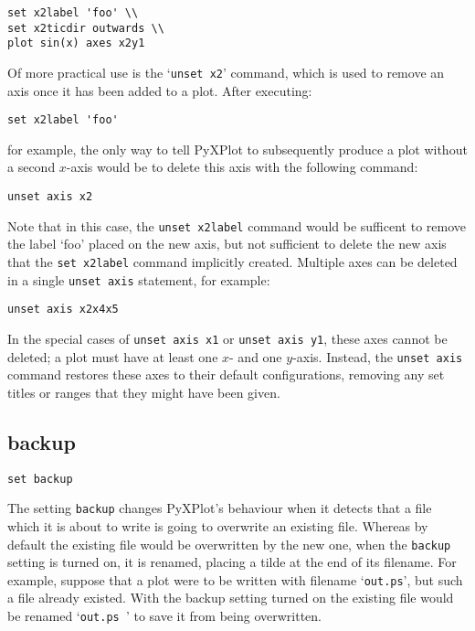 \documentclass[a4paper,onecolumn,11pt]{book}
\begin{document}
\begin{verbatim}
set x2label 'foo' \\
set x2ticdir outwards \\
plot sin(x) axes x2y1
\end{verbatim}

Of more practical use is the `{\tt unset x2}' command, which is used to remove an
axis once it has been added to a plot. After executing:

\begin{verbatim}
set x2label 'foo'
\end{verbatim}

\noindent for example, the only way to tell PyXPlot to subsequently produce a plot
without a second $x$-axis would be to delete this axis with the following
command:

\begin{verbatim}
unset axis x2
\end{verbatim}

Note that in this case, the {\tt unset x2label} command would be sufficent to
remove the label `foo' placed on the new axis, but not sufficient to delete the
new axis that the {\tt set x2label} command implicitly created. Multiple axes
can be deleted in a single {\tt unset axis} statement, for example:

\begin{verbatim}
unset axis x2x4x5
\end{verbatim}

In the special cases of {\tt unset axis x1} or {\tt unset axis y1}, these axes
cannot be deleted; a plot must have at least one $x$- and one $y$-axis. Instead,
the {\tt unset axis} command restores these axes to their default
configurations, removing any set titles or ranges that they might have been
given.

\subsection{backup}

\begin{verbatim}
set backup
\end{verbatim}

The setting {\tt backup} changes PyXPlot's behaviour when it detects that a file
which it is about to write is going to overwrite an existing file. Whereas by
default the existing file would be overwritten by the new one, when the
{\tt backup} setting is turned on, it is renamed, placing a tilde at the end of
its filename. For example, suppose that a plot were to be written with filename
`{\tt out.ps}', but such a file already existed.  With the backup setting turned on
the existing file would be renamed `{\tt out.ps~}' to save it from being overwritten.
\end{document}
